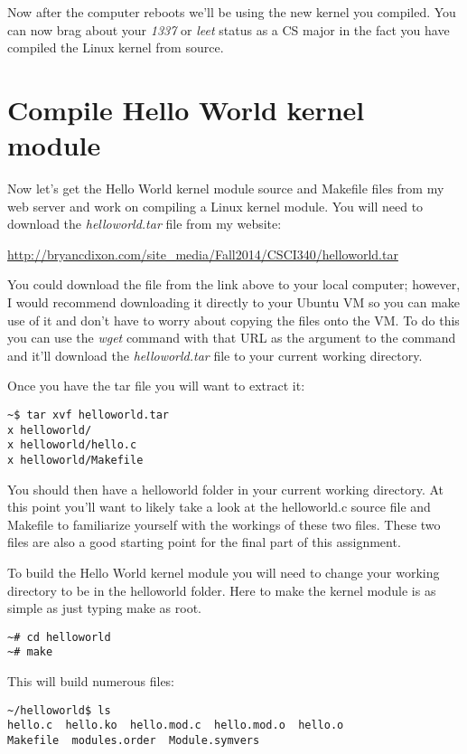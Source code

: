 \documentclass[11pt]{article}
\begin{document}
Now after the computer reboots we'll be using the new kernel you compiled. You can now brag about your \emph{1337} or \emph{leet} status as a CS major in the fact you have compiled the Linux kernel from source. 

\section*{Compile Hello World kernel module}

Now let's get the Hello World kernel module source and Makefile files from my web server and work on compiling a Linux kernel module. You will need to download the {\it helloworld.tar} file from my website:

{\url{http://bryancdixon.com/site_media/Fall2014/CSCI340/helloworld.tar}}

You could download the file from the link above to your local computer; however, I would recommend downloading it directly to your Ubuntu VM so you can make use of it and don't have to worry about copying the files onto the VM. To do this you can use the {\it wget} command with that URL as the argument to the command and it'll download the {\it helloworld.tar} file to your current working directory.

Once you have the tar file you will want to extract it:

\begin{verbatim}
~$ tar xvf helloworld.tar
x helloworld/
x helloworld/hello.c
x helloworld/Makefile
\end{verbatim}

You should then have a helloworld folder in your current working directory. At this point you'll want to likely take a look at the helloworld.c source file and Makefile to familiarize yourself with the workings of these two files. These two files are also a good starting point for the final part of this assignment. 

To build the Hello World kernel module you will need to change your working directory to be in the helloworld folder. Here to make the kernel module is as simple as just typing make as root.

\begin{verbatim}
~# cd helloworld
~# make
\end{verbatim}

\newpage

This will build numerous files:

\begin{verbatim}
~/helloworld$ ls
hello.c  hello.ko  hello.mod.c  hello.mod.o  hello.o  
Makefile  modules.order  Module.symvers
\end{verbatim}
\end{document}
